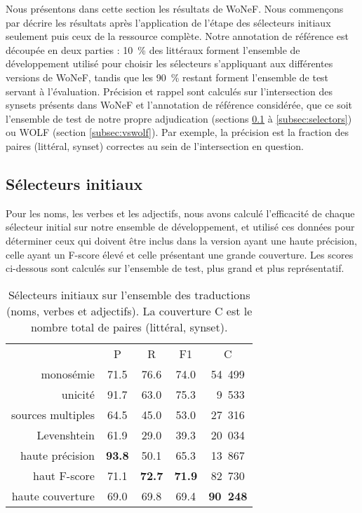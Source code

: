 
Nous présentons dans cette section les résultats de WoNeF. Nous commençons par décrire les résultats après l'application de l'étape des sélecteurs initiaux seulement puis ceux de la ressource complète. Notre annotation de référence est découpée en deux parties : 10~\% des littéraux forment l'ensemble de développement utilisé pour choisir les sélecteurs s'appliquant aux différentes versions de WoNeF, tandis que les 90~\% restant forment l'ensemble de test servant à l'évaluation. Précision et rappel sont calculés sur l'intersection des synsets présents dans WoNeF et l'annotation de référence considérée, que ce soit l'ensemble de test de notre propre adjudication (sections \ref{subsec:heuristics} à \ref{subsec:selectors}) ou WOLF (section \ref{subsec:vswolf}). Par exemple, la précision est la fraction des paires (littéral, synset) correctes au sein de l'intersection en question.

\subsection{Sélecteurs initiaux}
\label{subsec:heuristics}

Pour les noms, les verbes et les adjectifs, nous avons calculé l'efficacité de chaque sélecteur initial sur notre ensemble de développement, et utilisé ces données pour déterminer ceux qui doivent être inclus dans la version ayant une haute précision, celle ayant un F-score élevé et celle présentant une grande couverture. Les scores ci-dessous sont calculés sur l'ensemble de test, plus grand et plus représentatif.

\let\b\textbf

\begin{table}[ht]
\centering
\begin{tabular}{rcccc}
  \toprule
                    & P & R & F1 & C \\
  monosémie         & 71.5 & 76.6 & 74.0 & 54~499 \\
  unicité           & 91.7 & 63.0 & 75.3 & ~9~533 \\
  sources multiples & 64.5 & 45.0 & 53.0 & 27~316 \\
  Levenshtein       & 61.9 & 29.0 & 39.3 & 20~034 \\
  \midrule
  haute précision   & \b{93.8} & 50.1     & 65.3     & 13~867 \\
  haut F-score      & 71.1     & \b{72.7} & \b{71.9} & 82~730 \\
  haute couverture  & 69.0     & 69.8     & 69.4     & \b{90~248} \\
  \bottomrule
\end{tabular}
\caption{\protect\centering\label{table:heuristics}Sélecteurs initiaux sur l'ensemble des traductions (noms, verbes et adjectifs). La couverture C est le nombre total de paires (littéral, synset).}
\end{table}

